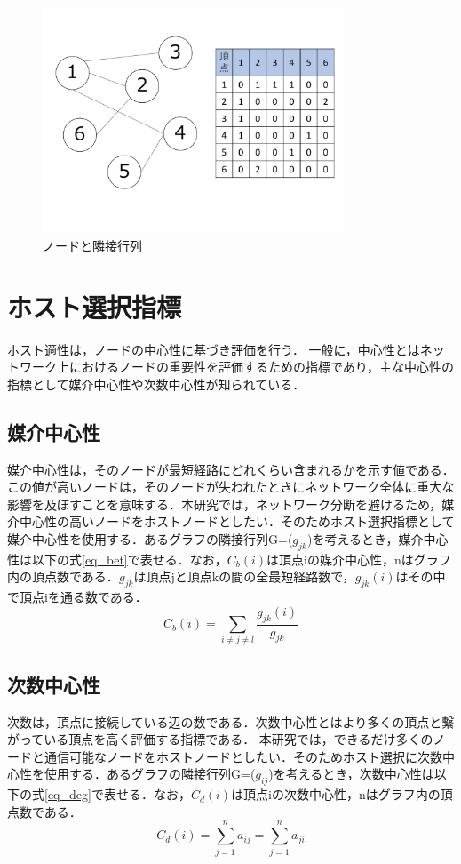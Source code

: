 \begin{figure}[H]
  \centering
  \includegraphics[width=0.8\textwidth]{figures/9.pdf}
  \caption{ノードと隣接行列}
  \label{fig:adj}
\end{figure}

\section{ホスト選択指標}
ホスト適性は，ノードの中心性に基づき評価を行う．
一般に，中心性とはネットワーク上におけるノードの重要性を評価するための指標であり，主な中心性の指標として媒介中心性や次数中心性が知られている．
\subsection*{媒介中心性}
媒介中心性は，そのノードが最短経路にどれくらい含まれるかを示す値である．この値が高いノードは，そのノードが失われたときにネットワーク全体に重大な影響を及ぼすことを意味する．本研究では，ネットワーク分断を避けるため，媒介中心性の高いノードをホストノードとしたい．そのためホスト選択指標として媒介中心性を使用する．あるグラフの隣接行列G=($g_{jk}$)を考えるとき，媒介中心性は以下の式\ref{eq_bet}で表せる．なお，$C_{b}(i)$は頂点iの媒介中心性，nはグラフ内の頂点数である．$g_{jk}$は頂点jと頂点kの間の全最短経路数で，$g_{jk}(i)$はその中で頂点iを通る数である．
\begin{equation}
\label{eq_bet}
C_{b}(i)=\sum_{i\neq j\neq l} \frac{g_{jk}(i)}{g_{jk}}
\end{equation}
\subsection*{次数中心性}
次数は，頂点に接続している辺の数である．次数中心性とはより多くの頂点と繋がっている頂点を高く評価する指標である．
本研究では，できるだけ多くのノードと通信可能なノードをホストノードとしたい．そのためホスト選択に次数中心性を使用する．あるグラフの隣接行列G=($g_{ij}$)を考えるとき，次数中心性は以下の式\ref{eq_deg}で表せる．なお，$C_{d}(i)$は頂点iの次数中心性，nはグラフ内の頂点数である．
\begin{equation}
\label{eq_deg}
C_{d}(i)=\sum_{j=1}^{n} a_{ij}=\sum_{j=1}^{n} a_{ji}
\end{equation}

